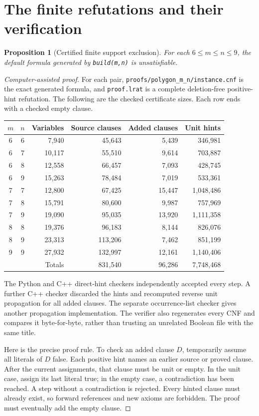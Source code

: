 \documentclass[11pt,a4paper]{article}
\newtheorem{proposition}[theorem]{Proposition}
\theoremstyle{definition}\newtheorem{definition}[theorem]{Definition}
\theoremstyle{remark}\newtheorem{remark}[theorem]{Remark}
\begin{document}
\section{The finite refutations and their verification}\label{sec:certificate}
\begin{proposition}[Certified finite support exclusion]\label{prop:finite}
For each $6\le m\le n\le9$, the default formula generated by
\texttt{build(m,n)} is unsatisfiable.
\end{proposition}
\begin{proof}[Computer-assisted proof]
For each pair, \texttt{proofs/polygon\_m\_n/instance.cnf} is the exact generated
formula, and \texttt{proof.lrat} is a complete deletion-free positive-hint
refutation. The following are the checked certificate sizes. Each row ends
with a checked empty clause.
\begin{center}\small
\begin{tabular}{@{}ccrrrr@{}}\toprule
$m$&$n$&Variables&Source clauses&Added clauses&Unit hints\\\midrule
6&6&7,940&45,643&5,439&346,981\\
6&7&10,117&55,510&9,614&703,887\\
6&8&12,558&66,457&7,093&428,745\\
6&9&15,263&78,484&7,019&533,361\\
7&7&12,800&67,425&15,447&1,048,486\\
7&8&15,791&80,600&9,987&757,969\\
7&9&19,090&95,035&13,920&1,111,358\\
8&8&19,376&96,183&8,144&826,076\\
8&9&23,313&113,206&7,462&851,199\\
9&9&27,932&132,997&12,161&1,140,406\\\midrule
\multicolumn{3}{r}{Totals}&831,540&96,286&7,748,468\\\bottomrule
\end{tabular}
\end{center}
The Python and C++ direct-hint checkers independently accepted every step.
A further C++ checker discarded the hints and recomputed reverse unit
propagation for all added clauses. The separate occurrence-list checker gives
another propagation implementation. The verifier also regenerates every CNF
and compares it byte-for-byte, rather than trusting an unrelated Boolean
file with the same title.

Here is the precise proof rule. To check an added clause $D$, temporarily
assume all literals of $D$ false. Each positive hint names an earlier source
or proved clause. After the current assignments, that clause must be unit
or empty. In the unit case, assign its last literal true; in the empty case,
a contradiction has been reached. A step without a contradiction is rejected.
Every hinted clause must already exist, so forward references and new axioms
are forbidden. The proof must eventually add the empty clause.


\end{proof}
\end{document}
